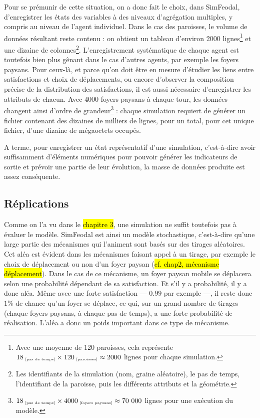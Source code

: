 	Pour se prémunir de cette situation, on a donc fait le choix, dans SimFeodal, d'enregistrer les états des variables à des niveaux d'agrégation multiples, y compris au niveau de l'agent individuel. Dans le cas des paroisses, le volume de données résultant reste contenu : on obtient un tableau d'environ 2000 lignes\footnote{
	Avec une moyenne de 120 paroisses, cela représente $18_{\text{\tiny ~[pas de temps]}} \times 120_{\text{\tiny ~[paroisses]}} \approx 2000$ lignes pour chaque simulation.
	} et une dizaine de colonnes\footnote{
	Les identifiants de la simulation (nom, graine aléatoire), le pas de temps, l'identifiant de la paroisse, puis les différents attributs et la géométrie.
	}.
	L'enregistrement systématique de chaque agent est toutefois bien plus gênant dans le cas d'autres agents, par exemple les foyers paysans. Pour ceux-là, et parce qu'on doit être en mesure d'étudier les liens entre satisfactions et choix de déplacements, ou encore d'observer la composition précise de la distribution des satisfactions, il est aussi nécessaire d'enregistrer les attributs de chacun. Avec $4000$ foyers paysans à chaque tour, les données changent ainsi d'ordre de grandeur\footnote{
	$18_{\text{\tiny ~[pas de temps]}} \times 4000_{\text{\tiny ~[foyers paysans]}} \approx 70~000$ lignes pour une exécution du modèle.
	} : chaque simulation requiert de générer un fichier contenant des dizaines de milliers de lignes, pour un total, pour cet unique fichier, d'une dizaine de mégaoctets occupés.

	A terme, pour enregistrer un état représentatif d'une simulation, c'est-à-dire avoir suffisamment d'éléments numériques pour pouvoir générer les indicateurs de sortie et prévoir une partie de leur évolution, la masse de données produite est assez conséquente.

	\subsection{Réplications}

	Comme on l'a vu dans le \hl{chapitre 3}, une simulation ne suffit toutefois pas à évaluer le modèle.
	SimFeodal est ainsi un modèle stochastique, c'est-à-dire qu'une large partie des mécanismes qui l'animent sont basés sur des tirages aléatoires.
	Cet aléa est évident dans les mécanismes faisant appel à un tirage, par exemple le choix de déplacement ou non d'un foyer paysan (\hl{cf. chap2, mécanisme déplacement}).
	Dans le cas de ce mécanisme, un foyer paysan mobile se déplacera selon une probabilité dépendant de sa satisfaction.
	Et s'il y a probabilité, il y a donc aléa.
	Même avec une forte satisfaction --- $0.99$ par exemple ---, il reste donc $1\%$ de chance qu'un foyer se déplace, ce qui, sur un grand nombre de tirages (chaque foyers paysans, à chaque pas de temps), a une forte probabilité de réalisation.
	L'aléa a donc un poids important dans ce type de mécanisme.

